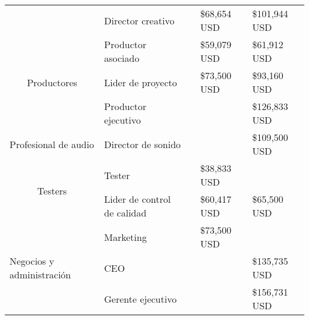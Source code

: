 \begin{table}[]
\begin{tabular}{lllll}
		\multicolumn{1}{c}{}                                      & Director creativo           &                                     & \$68,654 USD                & \$101,944 USD                          \\
		\multicolumn{1}{c}{\multirow{3}{*}{Productores}}          & Productor asociado          &                                     & \$59,079 USD                & \$61,912 USD                           \\
		\multicolumn{1}{c}{}                                      & Lider de proyecto           &                                     & \$73,500 USD                & \$93,160 USD                           \\
		\multicolumn{1}{c}{}                                      & Productor ejecutivo         &                                     &                             & \$126,833 USD                          \\
		Profesional de audio                                      & Director de sonido          &                                     &                             & \$109,500 USD                          \\
		\multicolumn{1}{c}{\multirow{2}{*}{Testers}}              & Tester                      &                                     & \$38,833 USD                &                                        \\
		\multicolumn{1}{c}{}                                      & Lider de control de calidad &                                     & \$60,417 USD                & \$65,500 USD                           \\
		\multirow{3}{*}{Negocios y administración}                & Marketing                   &                                     & \$73,500 USD                &                                        \\
		& CEO                         &                                     &                             & \$135,735 USD                          \\
		& Gerente ejecutivo           &                                     &                             & \$156,731 USD                         
	\end{tabular}
\end{table}

